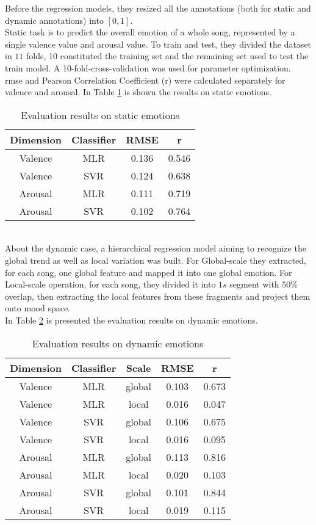 Before the regression models, they resized all the annotations (both for static and dynamic annotations) into $[0,1]$.
\\ \indent
Static task is to predict the overall emotion of a whole song, represented by a single valence value and arousal value. To train and test, they divided the dataset in $11$ folds, 10 constituted the training set and the remaining set used to test the train model. A 10-fold-cross-validation was used for parameter optimization.
\\
\gls{rmse} and Pearson Correlation Coefficient (r) were calculated separately for valence and arousal. In Table \ref{table:PMEmo_results_static} is shown the results on static emotions.
\begin{table}[h]
	\centering
	\begin{tabular}{|c|c|c|c|}
		\hline
		Dimension & Classifier & RMSE & r \\ [0.5ex] 
		\hline\hline Valence & MLR & 0.136 & 0.546 \\ 
		\hline Valence & SVR & 0.124 & 0.638 \\
		\hline Arousal & MLR & 0.111 & 0.719 \\
		\hline Arousal & SVR & 0.102 & 0.764 \\
		\hline
	\end{tabular}
	\caption{Evaluation results on static emotions}
	\label{table:PMEmo_results_static}
\end{table}
\\
About the dynamic case, a hierarchical regression model aiming to recognize the global trend as well as local variation was built. For Global-scale they extracted, for each song, one global feature and mapped it into one global emotion. For Local-scale operation, for each song, they divided it into $1s$ segment with $50\%$ overlap, then extracting the local features from these fragments and project them onto mood space.
\\ \indent
In Table \ref{table:PMEmo_results_dynamic} is presented the evaluation results on dynamic emotions.
\begin{table}[h!]
	\centering
	\begin{tabular}{|c|c|c|c|c|}
		\hline
		Dimension & Classifier & Scale & RMSE & r \\ [0.5ex] 
		\hline\hline Valence & MLR & global & 0.103 & 0.673 \\
		\hline Valence & MLR & local & 0.016 & 0.047 \\
		\hline Valence & SVR & global & 0.106 & 0.675 \\
		\hline Valence & SVR & local & 0.016 & 0.095 \\
		\hline Arousal & MLR & global & 0.113 & 0.816 \\
		\hline Arousal & MLR & local & 0.020 & 0.103 \\
		\hline Arousal & SVR & global & 0.101 & 0.844 \\
		\hline Arousal & SVR & local & 0.019 & 0.115 \\
		\hline
	\end{tabular}
	\caption{Evaluation results on dynamic emotions}
	\label{table:PMEmo_results_dynamic}
\end{table}
